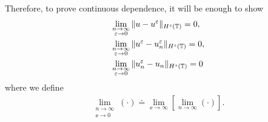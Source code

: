 Therefore, to prove continuous dependence, it will be enough to show 
\begin{align}
& \lim_{\substack{n\to \infty \\ \varepsilon \to 0}} \|u - u^\varepsilon\|_{H^s(\mathbb{T})}
=0,
\label{enough_to_prove1}
\\
& \lim_{\substack{n\to \infty \\ \varepsilon \to 0}} \|u^\varepsilon - u^{\varepsilon}_n
\|_{H^s(\mathbb{T})} = 0,
\label{enough_to_prove2}
\\
& \lim_{\substack{n\to \infty \\ \varepsilon \to 0}}
\|u^{\varepsilon}_n - u_n \|_{H^s(\mathbb{T})} =0
\label{enough_to_prove3}
\end{align}
where we define 
\medskip
\begin{equation}
\label{lim-not}
\begin{split}
\lim_{\substack{n\to \infty \\ \ee \to 0}} (\cdot) \doteq \lim_{\ee \to
\infty} [\lim_{n \to \infty} (\cdot )].
\end{split}
\end{equation}

